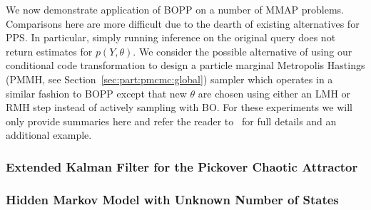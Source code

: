 We now demonstrate application of BOPP on a number of MMAP problems.  
Comparisons here are more difficult due to the dearth of existing alternatives for PPS.  
In particular, simply running inference on the original query does not return estimates 
for $p\left(Y,\theta\right)$.  We consider the possible alternative of using our 
conditional code transformation to design a particle marginal Metropolis Hastings 
(PMMH, see Section~\ref{sec:part:pmcmc:global}) sampler which operates in a similar fashion to 
BOPP except that new $\theta$ are chosen using either an LMH or RMH step instead 
of actively sampling with BO. For these experiments we will only provide summaries 
here and refer the reader to~\cite{rainforth2017boppArxiv} for full details and an 
additional example.
%
%
%

\subsubsection{Extended Kalman Filter for the Pickover Chaotic Attractor}
\label{sec:AppKalman}



\subsubsection{Hidden Markov Model with Unknown Number of States}



